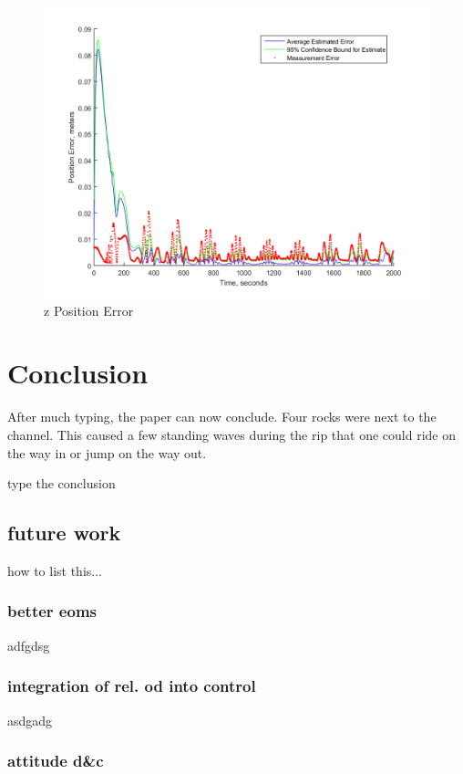 \documentclass[]{aiaa-tc}%
\begin{document}
\begin{figure}
  \includegraphics[width=\linewidth]{zErrorPlot.png}
  \caption{z Position Error}
  \label{fig:zErrorPlot}
\end{figure}

\section{Conclusion}

After much typing, the paper can now conclude.
Four rocks were next to the channel.
This caused a few standing waves during the rip that one could ride on
the way in or jump on the way out.

type the conclusion

\subsection{future work}

how to list this...

\subsubsection{better eoms}

adfgdsg

\subsubsection{integration of rel. od into control}

asdgadg

\subsubsection{attitude d\&c}
\end{document}
